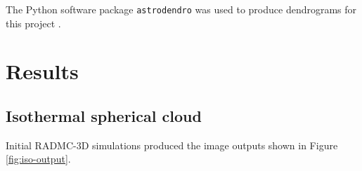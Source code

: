 \documentclass{report}
\begin{document}
The Python software package \texttt{astrodendro} was used to produce dendrograms for this project \parencite{astrodendro}.


\chapter{Results}

\section{Isothermal spherical cloud}
Initial RADMC-3D simulations produced the image outputs shown in Figure \ref{fig:iso-output}.
\end{document}
